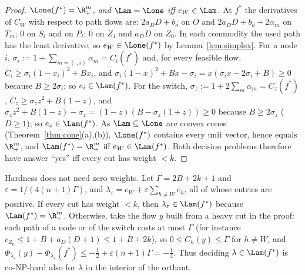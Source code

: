 \begin{proof}
\emph{$\Lone(f^*)=\R^m_+$, and $\Lam=\Lone$ iff $e_W\in\Lam$.} At $f^*$ the derivatives of $C_W$ with respect to path flows are: $2a_DD+b_o$ on $O$ and $2a_DD+b_o+2\alpha_m$ on $T_m$; $0$ on $S_i$ and on $P_i$; $0$ on $Z_1$ and $a_DD$ on $Z_0$. In each commodity the used path has the least derivative, so $e_W\in\Lone(f^*)$ by Lemma~\ref{lem:simplex}. For a node $i$, $\sigma_i:=1+\sum_{m=(\cdot,i)}\alpha_m=C_i(f^*)$ and, for every feasible flow, $C_i\ge\sigma_i(1-x_i)^2+Bx_i$, and $\sigma_i(1-x)^2+Bx-\sigma_i=x(\sigma_ix-2\sigma_i+B)\ge0$ because $B\ge2\sigma_i$; so $e_i\in\Lam(f^*)$. For the switch, $\sigma_z:=1+2\sum_m\alpha_m=C_z(f^*)$, $C_z\ge\sigma_zz^2+B(1-z)$, and $\sigma_zz^2+B(1-z)-\sigma_z=(1-z)(B-\sigma_z(1+z))\ge0$ because $B\ge2\sigma_z$ ($D\ge1$); so $e_z\in\Lam(f^*)$. As $\Lam\subseteq\Lone$ are convex cones (Theorem~\ref{thm:cone}(a),(b)), $\Lone(f^*)$ contains every unit vector, hence equals $\R^m_+$, and $\Lam(f^*)=\R^m_+$ iff $e_W\in\Lam(f^*)$. Both decision problems therefore have answer ``yes'' iff every cut has weight $<k$.
\end{proof}

\begin{remark}\label{rem:interior}
Hardness does not need zero weights. Let $\Gamma=2B+2k+1$ and $\varepsilon=1/(4(n+1)\Gamma)$, and $\lambda_\varepsilon=e_W+\varepsilon\sum_{h\ne W}e_h$, all of whose entries are positive. If every cut has weight $<k$, then $\lambda_\varepsilon\in\Lam(f^*)$ because $\Lam(f^*)=\R^m_+$. Otherwise, take the flow $y$ built from a heavy cut in the proof: each path of a node or of the switch costs at most $\Gamma$ (for instance $c_{Z_0}\le1+B+a_D(D+1)\le1+B+2k$), so $0\le C_h(y)\le\Gamma$ for $h\ne W$, and $\Phi_{\lambda_\varepsilon}(y)-\Phi_{\lambda_\varepsilon}(f^*)\le-\tfrac12+\varepsilon(n+1)\Gamma=-\tfrac14$. Thus deciding $\lambda\in\Lam(f^*)$ is co-NP-hard also for $\lambda$ in the interior of the orthant. 
\end{remark}

